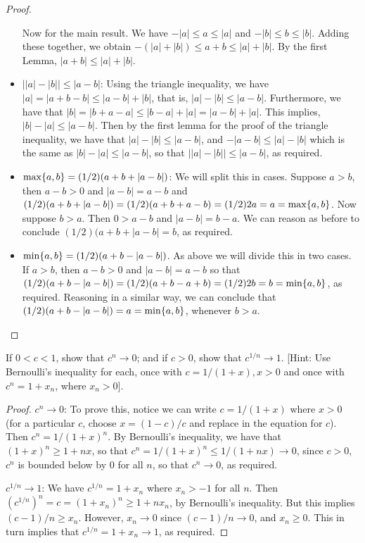 \begin{proof}
\begin{itemize}
     Now for the main result. We have $-\lvert a\rvert\leq a\leq\lvert a\rvert$ and $-\lvert b\rvert\leq b\leq\lvert b\rvert$. Adding these together, we obtain $-(\lvert a\rvert+\lvert b\rvert)\leq a+b\leq\lvert a\rvert+\lvert b\rvert$. By the first Lemma, $\lvert a+b\rvert\leq\lvert a\rvert +\lvert b\rvert$.
     \item $\lvert\lvert a\rvert -\lvert b\rvert\rvert \leq\lvert a-b\rvert$: Using the triangle inequality, we have $\lvert a\rvert = \lvert a+b-b\rvert \leq \lvert a-b\rvert +\lvert b\rvert$, that is, $\lvert a\rvert-\lvert b\rvert\leq \lvert a-b\rvert$. Furthermore, we have that $\lvert b\rvert =\lvert b+a-a\lvert \leq\lvert b-a\rvert+\lvert a\rvert =\lvert a-b\rvert +\lvert a\rvert$. This implies, $\lvert b\rvert -\lvert a\rvert \leq\lvert a-b\rvert$. Then by the first lemma for the proof of the triangle inequality, we have that $\lvert a\rvert -\lvert b\rvert\leq \lvert a-b\rvert$, and $-\lvert a-b\rvert\leq\lvert a\rvert -\lvert b\rvert$ which is the same as $\lvert b\rvert-\lvert a\rvert\leq\lvert a-b\rvert$, so that $\lvert \lvert a\rvert -\lvert b\rvert \rvert \leq \lvert a-b\rvert$, as required.
     \item $\max\{a,b \}=(1/2)(a+b+\lvert a-b\rvert)$: We will split this in cases. Suppose $a>b$, then $a-b>0$ and $\lvert a-b\rvert =a-b$ and $(1/2)(a+b+\lvert a-b\rvert) =(1/2)(a+b+a-b) =(1/2)2a =a =\max\{a,b\}$. Now suppose $b>a$. Then $0>a-b$ and $\lvert a-b\rvert = b-a$. We can reason as before to conclude $(1/2)(a+b+\lvert a-b\rvert =b$, as required.
     \item $\min\{a,b\}=(1/2)(a+b-\lvert a-b\rvert)$. As above we will divide this in two cases. If $a>b$, then $a-b>0$ and $\lvert a-b\rvert =a-b$ so that $(1/2)(a+b-\lvert a-b\rvert) =(1/2)(a+b-a+b) =(1/2)2b =b =\min\{a,b\}$, as required. Reasoning in a similar way, we can conclude that $(1/2)(a+b-\lvert  a-b\rvert) =a =\min\{a,b\}$, whenever $b>a$.
\end{itemize}
\end{proof}

\begin{exercise}{19}
If $0<c<1$, show that $c^n\to 0$; and if $c>0$, show that $c^{1/n}\to 1$. [Hint: Use Bernoulli's inequality for each, once with $c=1/(1+x), x>0$ and once with $c^n=1+x_n$, where $x_n>0$].
\end{exercise}
\begin{proof}
$c^n\to 0$: To prove this, notice we can write $c=1/(1+x)$ where $x>0$ (for a particular $c$, choose $x=(1-c)/c$ and replace in the equation for $c$). Then $c^n= 1/(1+x)^n$. By Bernoulli's inequality, we have that $(1+x)^n\geq 1+nx$, so that $c^n= 1/(1+x)^n\leq 1/(1+nx)\to 0$, since $c>0$, $c^n$ is bounded below by 0 for all $n$, so that $c^n\to 0$, as required.

$c^{1/n}\to 1$: We have $c^{1/n}= 1+x_n$ where $x_n>-1$ for all $n$. Then $(c^{1/n})^n= c= (1+x_n)^n\geq 1+nx_n$, by Bernoulli's inequality. But this implies $(c-1)/n\geq x_n$. However, $x_n\to 0$ since $(c-1)/n\to 0$, and $x_n\geq 0$. This in turn implies that $c^{1/n}= 1+x_n\to 1$, as required.
\end{proof}

